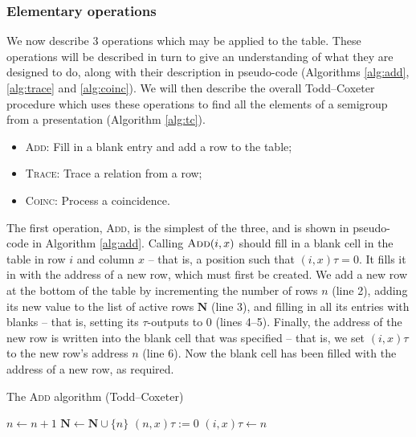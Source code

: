 \subsubsection{Elementary operations}

We now describe 3 operations which may be applied to the table.  These
operations will be described in turn to give an understanding of what they are
designed to do, along with their description in pseudo-code
(Algorithms \ref{alg:add}, \ref{alg:trace} and \ref{alg:coinc}).  We will then
describe the overall Todd--Coxeter procedure which uses these operations
to find all the elements of a semigroup from a presentation
(Algorithm \ref{alg:tc}).

\begin{itemize}
\item \textsc{Add}: Fill in a blank entry and add a row to the table;
\item \textsc{Trace}: Trace a relation from a row;
\item \textsc{Coinc}: Process a coincidence.
\end{itemize}

The first operation, \textsc{Add}, is the simplest of the three, and is shown in
pseudo-code in Algorithm \ref{alg:add}.  Calling $\textsc{Add}(i,x)$ should fill
in a blank cell in the table in row $i$ and column $x$ -- that is, a position
such that $(i,x)\tau = 0$.  It fills it in with the address of a new row, which
must first be created.  We add a new row at the bottom of the table by
incrementing the number of rows $n$ (line 2), adding its new value to the list
of active rows $\mathbf{N}$ (line 3), and filling in all its entries with blanks
-- that is, setting its $\tau$-outputs to 0 (lines 4--5).  Finally, the address
of the new row is written into the blank cell that was specified -- that is, we
set $(i,x)\tau$ to the new row's address $n$ (line 6).  Now the blank cell has
been filled with the address of a new row, as required.

\begin{algorithm}
\caption{The \textsc{Add} algorithm (Todd--Coxeter)}
\label{alg:add}
\begin{algorithmic}[1]
\State $n \gets n + 1$
\State $\mathbf{N} \gets \mathbf{N} \cup \{n\}$
  \State $(n, x)\tau := 0$
\EndFor
\State $(i, x)\tau \gets n$
\EndProcedure
\end{algorithmic}
\end{algorithm}

